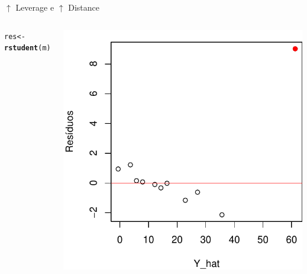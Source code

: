 \documentclass{beamer}\usepackage[]{graphicx}\usepackage[]{color}
\makeatletter
\newcommand{\hlstd}[1]{\textcolor[rgb]{0.345,0.345,0.345}{#1}}%
\newcommand{\hlkwb}[1]{\textcolor[rgb]{0.69,0.353,0.396}{#1}}%
\newcommand{\hlkwd}[1]{\textcolor[rgb]{0.737,0.353,0.396}{\textbf{#1}}}%
\newenvironment{kframe}{%
 \def\at@end@of@kframe{}%
 \ifinner\ifhmode%
  \def\at@end@of@kframe{\end{minipage}}%
  \begin{minipage}{\columnwidth}%
 \fi\fi%
 \def\FrameCommand##1{\hskip\@totalleftmargin \hskip-\fboxsep
 \colorbox{shadecolor}{##1}\hskip-\fboxsep
     \hskip-\linewidth \hskip-\@totalleftmargin \hskip\columnwidth}%
 \MakeFramed {\advance\hsize-\width
   \@totalleftmargin\z@ \linewidth\hsize
   \@setminipage}}%
 {\par\unskip\endMakeFramed%
 \at@end@of@kframe}
\newenvironment{knitrout}{}{} %
\renewenvironment{knitrout}{\setlength{\topsep}{0mm}}{}
\makeatother
\begin{document}
\begin{frame}{$\uparrow$ Leverage e $\uparrow$ Distance}
\begin{columns}[c]
\begin{knitrout}\tiny
{}\color{fgcolor}\begin{kframe}
\begin{alltt}
\hlstd{res} \hlkwb{<-} \hlkwd{rstudent}\hlstd{(m)}
\end{alltt}
\end{kframe}
\includegraphics[width=1\linewidth]{figure/inf00-0-1} 

\end{knitrout}

\end{columns}
\end{frame}
\end{document}
